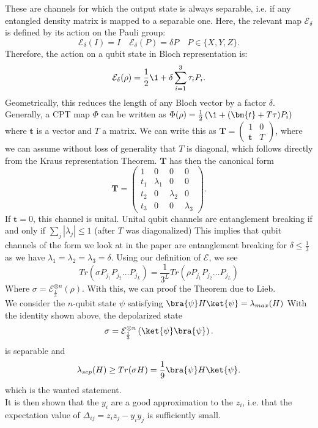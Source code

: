These are channels for which the output state is always separable, i.e. if any entangled density matrix is mapped to a separable one.\cite{horodecki03}
Here, the relevant map $\mathcal{E}_{\delta}$ is defined by its action on the Pauli group: \[
	\mathcal{E}_{\delta}(I)=I\quad\mathcal{E}_{\delta}(P)=\delta P\quad P\in \{X,Y,Z\}
.\]
Therefore, the action on a qubit state in Bloch representation is: \[
	\mathcal{E}_{\delta}(\rho) =  \frac{1}{2}\1 + \delta \sum_{i=1}^{3} \tau_i P_i
.\]
Geometrically, this reduces the length of any Bloch vector by a factor $\delta$.
Generally, a CPT map $\Phi$ can be written as $\Phi(\rho)=\frac{1}{2}\left( \1 + (\bm{t}+T\tau)P_i \right)$ where $\bm{t}$ is a vector and $T$ a matrix.\cite{ruskai03}
We can write this as $\bm{T}=\begin{pmatrix}
	1 & 0 \\
	\bm{t} & T
\end{pmatrix} $, where we can assume without loss of generality that $T$ is diagonal, which follows directly from the Kraus representation Theorem.
$\bm{T}$ has then the canonical form \[
\bm{T} = \begin{pmatrix}
	1 & 0 & 0 & 0\\
	t_1 & \lambda_1 & 0 & 0\\
	t_2 & 0 & \lambda_2 & 0 \\
	t_3 & 0 & 0 & \lambda_3
\end{pmatrix}
.\]
If $\bm{t}=0$, this channel is unital.
Unital qubit channels are entanglement breaking if and only if $\sum_{j} \left| \lambda_j \right| \le 1$ (after $T$ was diagonalized)\cite{ruskai03}
This implies that qubit channels of the form we look at in the paper are entanglement breaking for $\delta\le \frac{1}{3}$ as we have $\lambda_1=\lambda_2=\lambda_3=\delta$.
Using our definition of $\mathcal{E}$, we see \[
	Tr\left( \sigma P_{j_1}P_{j_2}\ldots P_{j_L} \right) = \frac{1}{3^L}Tr\left( \rho P_{j_1}P_{j_2}\ldots P_{j_L} \right)
\]
Where $\sigma=\mathcal{E}^{\otimes n}_{\frac{1}{3}}(\rho)$.
With this, we can proof the Theorem due to Lieb.\\
We consider the $n$-qubit state $\psi$ satisfying $\bra{\psi}H\ket{\psi}=\lambda_{max}(H)$
With the identity shown above, the depolarized state \[
	\sigma = \mathcal{E}^{\otimes n}_{\frac{1}{3}}\left( \ket{\psi}\bra{\psi} \right)
.\] is separable and \[
\lambda_{sep}(H) \ge Tr(\sigma H)=\frac{1}{9}\bra{\psi}H\ket{\psi}
.\] which is the wanted statement.\\
It is then shown that the $y_i$ are a good approximation to the $z_i$, i.e. that the expectation value of $\Delta_{ij}=z_iz_j-y_iy_j$ is sufficiently small.
